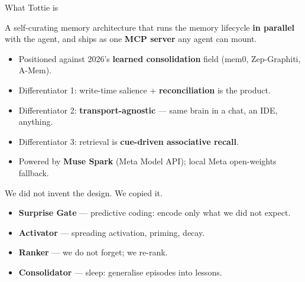 \documentclass[aspectratio=169,10pt]{beamer}
\begin{document}
\begin{frame}{What Tottie is}
  \begin{center}
    \Large A self-curating memory architecture that runs the memory lifecycle \textbf{in parallel}
    with the agent, and ships as one \textbf{MCP server} any agent can mount.
  \end{center}
  \vfill
  \begin{itemize}
    \item Positioned against 2026's \textbf{learned consolidation} field (mem0, Zep-Graphiti, A-Mem).
    \item Differentiator 1: write-time salience + \textbf{reconciliation} is the product.
    \item Differentiator 2: \textbf{transport-agnostic} --- same brain in a chat, an IDE, anything.
    \item Differentiator 3: retrieval is \textbf{cue-driven associative recall}.
    \item Powered by \textbf{Muse Spark} (Meta Model API); local Meta open-weights fallback.
  \end{itemize}
\end{frame}

\begin{frame}{We did not invent the design. We copied it.}
  \begin{figure}
    \centering
  \end{figure}
  \begin{itemize}
    \item \textbf{Surprise Gate} --- predictive coding: encode only what we did not expect.
    \item \textbf{Activator} --- spreading activation, priming, decay.
    \item \textbf{Ranker} --- we do not forget; we re-rank.
    \item \textbf{Consolidator} --- sleep: generalise episodes into lessons.
  \end{itemize}
\end{frame}
\end{document}
